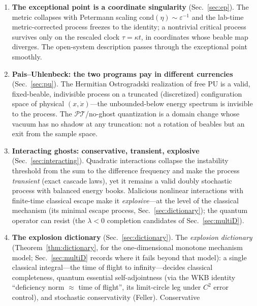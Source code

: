 \documentclass[11pt]{article}
\theoremstyle{definition}
\theoremstyle{remark}
\newcommand{\PT}{\mathcal{PT}}
\newcommand{\Gam}{\Gamma}
\begin{document}
\begin{enumerate}
  (Theorem~\ref{thm:terminal}) gives the generator in closed
  form: divisibility is lost at $t_c$ exactly when $\det\Gam$ crosses zero,
  permanently, with floor $-(\sin\theta+\tilde\kappa)$; the unbroken phase
  is recurrent instead. Late-window information backflow, by contrast,
  vanishes (numerically) in the
  broken phase: Barandes indivisibility is the strictly finer probe.
\item \textbf{The exceptional point is a coordinate singularity}
  (Sec.~\ref{sec:ep}). The metric collapses with Petermann scaling
  $\mathrm{cond}(\eta)\sim\varepsilon^{-1}$ and the lab-time
  metric-corrected process freezes to the identity; a nontrivial critical
  process survives only on the rescaled clock $\tau=\kappa t$, in
  coordinates whose beable map diverges. The open-system description passes
  through the exceptional point smoothly.
\item \textbf{Pais--Uhlenbeck: the two programs pay in different
  currencies} (Sec.~\ref{sec:pu}). The Hermitian Ostrogradski realization
  of free PU is a valid, fixed-beable, indivisible process on a truncated
  (discretized) configuration space of physical
  $(x,\dot x)$---the unbounded-below energy spectrum is
  invisible to the process. The $\PT$/no-ghost quantization is a domain
  change whose vacuum has no shadow at any truncation: not a rotation of
  beables but an exit from the sample space.
\item \textbf{Interacting ghosts: conservative, transient, explosive}
  (Sec.~\ref{sec:interacting}). Quadratic interactions collapse the
  instability threshold from the sum to the difference frequency and make
  the process \emph{transient} (exact cascade laws), yet it remains a valid
  doubly stochastic process with balanced energy books. Malicious nonlinear
  interactions with finite-time classical escape make it
  \emph{explosive}---at the level of the classical mechanism (its minimal
  escape process, Sec.~\ref{sec:dictionary}); the quantum operator can
  resist (the $\lambda<0$ completion candidates of
  Sec.~\ref{sec:multiD}).
\item \textbf{The explosion dictionary} (Sec.~\ref{sec:dictionary}).
  The \emph{explosion dictionary} (Theorem~\ref{thm:dictionary}, for
  the one-dimensional monotone mechanism model; Sec.~\ref{sec:multiD}
  records where it fails beyond that model): a
  single classical integral---the time of
  flight to infinity---decides classical completeness, quantum essential
  self-adjointness (via the WKB identity ``deficiency norm $\approx$
  time of
  flight'', its limit-circle leg under $C^{2}$ error control), and stochastic conservativity (Feller). Conservative

\end{enumerate}
\end{document}
